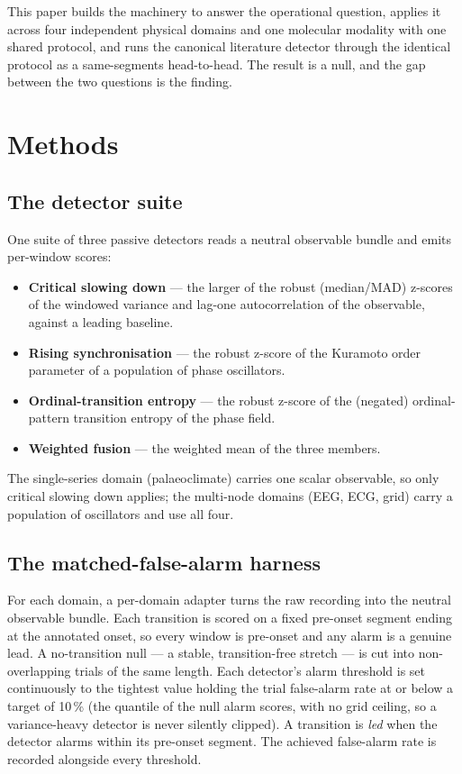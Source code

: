 \documentclass[aip,cha,preprint,amsmath,amssymb]{revtex4-2}
\begin{document}
This paper builds the machinery to answer the operational question,
applies it across four independent physical domains and one molecular
modality with one shared protocol, and runs the canonical literature
detector through the identical protocol as a same-segments
head-to-head. The result is a null, and the gap between the two
questions is the finding.

\section{Methods}\label{sec:methods}

\subsection{The detector suite}

One suite of three passive detectors reads a neutral observable bundle
and emits per-window scores:

\begin{itemize}
  \item \textbf{Critical slowing down} --- the larger of the robust
    (median/MAD) z-scores of the windowed variance and lag-one
    autocorrelation of the observable, against a leading baseline.
  \item \textbf{Rising synchronisation} --- the robust z-score of the
    Kuramoto order parameter of a population of phase oscillators.
  \item \textbf{Ordinal-transition entropy} --- the robust z-score of
    the (negated) ordinal-pattern transition entropy of the phase
    field.
  \item \textbf{Weighted fusion} --- the weighted mean of the three
    members.
\end{itemize}

The single-series domain (palaeoclimate) carries one scalar observable,
so only critical slowing down applies; the multi-node domains (EEG,
ECG, grid) carry a population of oscillators and use all four.

\subsection{The matched-false-alarm harness}

For each domain, a per-domain adapter turns the raw recording into the
neutral observable bundle. Each transition is scored on a fixed
pre-onset segment ending at the annotated onset, so every window is
pre-onset and any alarm is a genuine lead. A no-transition null --- a
stable, transition-free stretch --- is cut into non-overlapping trials
of the same length. Each detector's alarm threshold is set continuously
to the tightest value holding the trial false-alarm rate at or below a
target of 10\,\% (the quantile of the null alarm scores, with no grid
ceiling, so a variance-heavy detector is never silently clipped). A
transition is \emph{led} when the detector alarms within its pre-onset
segment. The achieved false-alarm rate is recorded alongside every
threshold.
\end{document}

